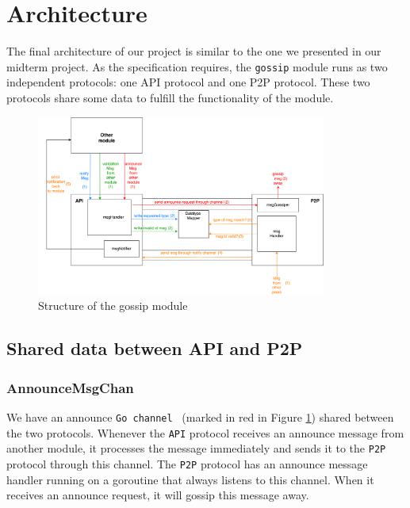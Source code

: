 \section{Architecture}

The final architecture of our project is similar to the one we presented in our midterm project. As the specification requires, the \texttt{gossip} module runs as two independent protocols: one API protocol and one P2P protocol. These two protocols share some data to fulfill the functionality of the module.

\begin{figure}[H]
    \centering
    \includegraphics[width=0.85\textwidth]{pics/architecture.png}
    \caption{Structure of the gossip module}
    \label{fig:architecture}
\end{figure}

\subsection{Shared data between API and P2P}

\subsubsection{AnnounceMsgChan}

We have an announce \texttt{Go channel}~\parencite{goChannel} (marked in red in Figure \ref{fig:architecture}) shared between the two protocols. Whenever the \texttt{API} protocol receives an announce message from another module, it processes the message immediately and sends it to the \texttt{P2P} protocol through this channel. The \texttt{P2P} protocol has an announce message handler running on a goroutine that always listens to this channel. When it receives an announce request, it will gossip this message away. 

